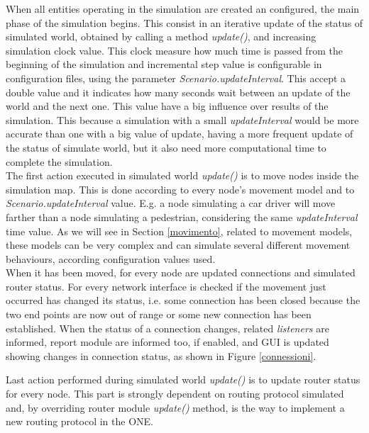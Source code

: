 When all entities operating in the simulation are created an configured, the main phase of the simulation begins. This consist in an iterative update of the status of simulated world, obtained by calling a method \textit{update()}, and increasing simulation clock value. This clock measure how much time is passed from the beginning of the simulation and incremental step value is configurable in configuration files, using the parameter \textit{Scenario.updateInterval}. This accept a double value and it indicates how many seconds wait between an update of the world and the next one. This value have a big influence over results of the simulation. This because a simulation with a small \textit{updateInterval} would be more accurate than one with a big value of update, having a more frequent update of the status of simulate world, but it also need more computational time to complete the simulation.
\\

The first action executed in simulated world \textit{update()} is to move nodes inside the simulation map. This is done according to every node's movement model and to \textit{Scenario.updateInterval} value. E.g. a node simulating a car driver will move farther than a node simulating a pedestrian, considering the same \textit{updateInterval} time value. As we will see in Section \ref{movimento}, related to movement models, these models can be very complex and can simulate several different movement behaviours, according configuration values used.
\\

When it has been moved, for every node are updated connections and simulated router status. For every network interface is checked if the movement just occurred has changed its status, i.e. some connection has been closed because the two end points are now out of range or some new connection has been established. When the status of a connection changes, related \textit{listeners} are informed, report module are informed too, if enabled, and GUI is updated showing changes in connection status, as shown in Figure \ref{connessioni}.
\\

Last action performed during simulated world \textit{update()} is to update router status for every node. This part is strongly dependent on routing protocol simulated and, by overriding router module \textit{update()} method, is the way to implement a new routing protocol in the ONE.

